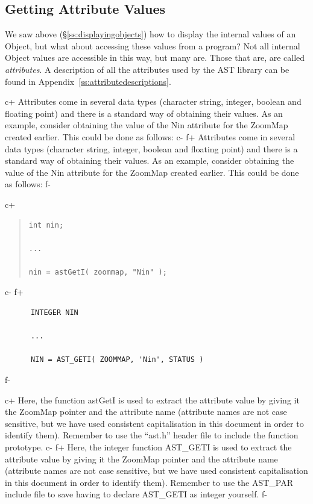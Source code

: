 \documentclass[twoside,11pt]{article}
\newcommand{\appref}[1]{Appendix~\ref{#1}}
\newcommand{\secref}[1]{\S\ref{#1}}
\newcommand{\appref}[1]{\ref{#1}}
\newcommand{\secref}[1]{\ref{#1}}
\begin{document}
\subsection{\label{ss:gettingattributes}Getting Attribute Values}

We saw above (\secref{ss:displayingobjects}) how to display the
internal values of an Object, but what about accessing these values
from a program?  Not all internal Object values are accessible in this
way, but many are. Those that are, are called {\em{attributes}}. A
description of all the attributes used by the AST library can be found
in \appref{ss:attributedescriptions}.

c+
Attributes come in several data types (character string, integer,
boolean and floating point) and there is a standard way of obtaining
their values. As an example, consider obtaining the value of the Nin
attribute for the ZoomMap created earlier. This could be done as
follows:
c-
f+
Attributes come in several data types (character string, integer,
boolean and floating point) and there is a standard way of obtaining
their values. As an example, consider obtaining the value of the Nin
attribute for the ZoomMap created earlier. This could be done as
follows:
f-

c+
\begin{quote}
\small
\begin{verbatim}
int nin;

...

nin = astGetI( zoommap, "Nin" );
\end{verbatim}
\normalsize
\end{quote}
c-
f+
\small
\begin{verbatim}
      INTEGER NIN

      ...

      NIN = AST_GETI( ZOOMMAP, 'Nin', STATUS )
\end{verbatim}
\normalsize
f-

c+
Here, the function astGetI is used to extract the attribute value by
giving it the ZoomMap pointer and the attribute name (attribute names
are not case sensitive, but we have used consistent capitalisation in
this document in order to identify them). Remember to use the
``ast.h'' header file to include the function prototype.
c-
f+
Here, the integer function AST\_GETI is used to extract the attribute
value by giving it the ZoomMap pointer and the attribute name
(attribute names are not case sensitive, but we have used consistent
capitalisation in this document in order to identify them). Remember
to use the AST\_PAR include file to save having to declare AST\_GETI
as integer yourself.
f-
\end{document}

